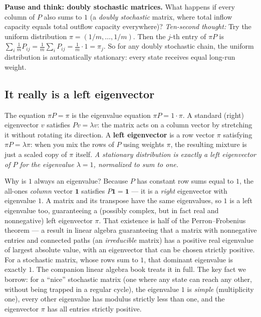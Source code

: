 \begin{recoverybox}
\textbf{Pause and think: doubly stochastic matrices.} What happens if every column of $P$ also sums to $1$ (a \emph{doubly stochastic} matrix, where total inflow capacity equals total outflow capacity everywhere)?
\emph{Ten-second thought:} Try the uniform distribution $\pi = (1/m, \dots, 1/m)$. Then the $j$-th entry of $\pi P$ is $\sum_i \frac{1}{m} P_{ij} = \frac{1}{m}\sum_i P_{ij} = \frac{1}{m}\cdot 1 = \pi_j$. So for any doubly stochastic chain, the uniform distribution is automatically stationary: every state receives equal long-run weight.
\end{recoverybox}

\subsection{It really is a left eigenvector}
\begin{connectionbox}
The equation $\pi P = \pi$ is the eigenvalue equation $\pi P = 1\cdot\pi$. A standard (right) eigenvector $v$ satisfies $P v = \lambda v$: the matrix acts on a column vector by stretching it without rotating its direction. A \textbf{left eigenvector} is a row vector $\pi$ satisfying $\pi P = \lambda \pi$: when you mix the rows of $P$ using weights $\pi$, the resulting mixture is just a scaled copy of $\pi$ itself. \emph{A stationary distribution is exactly a left eigenvector of $P$ for the eigenvalue $\lambda = 1$, normalized to sum to one.}

Why is $1$ always an eigenvalue? Because $P$ has constant row sums equal to $1$,
the all-ones \emph{column} vector $\mathbf{1}$ satisfies $P\mathbf{1} = \mathbf{1}$
--- it is a \emph{right} eigenvector with eigenvalue $1$. A matrix and its
transpose have the same eigenvalues, so $1$ is a left eigenvalue too, guaranteeing
a (possibly complex, but in fact real and nonnegative) left eigenvector $\pi$.
That existence is half of the Perron--Frobenius theorem --- a result in
linear algebra guaranteeing that a matrix with nonnegative entries and connected paths
(an \emph{irreducible} matrix) has a positive real eigenvalue of largest absolute value,
with an eigenvector that can be chosen strictly positive. For a stochastic matrix, whose
rows sum to $1$, that dominant eigenvalue is exactly $1$.
The companion linear algebra book treats it in full. The key fact we borrow: for a
``nice'' stochastic matrix (one where any state can reach any other, without being trapped in a regular cycle), the eigenvalue $1$ is
\emph{simple} (multiplicity one), every other eigenvalue has modulus strictly
less than one, and the eigenvector $\pi$ has all entries strictly positive.
\end{connectionbox}
